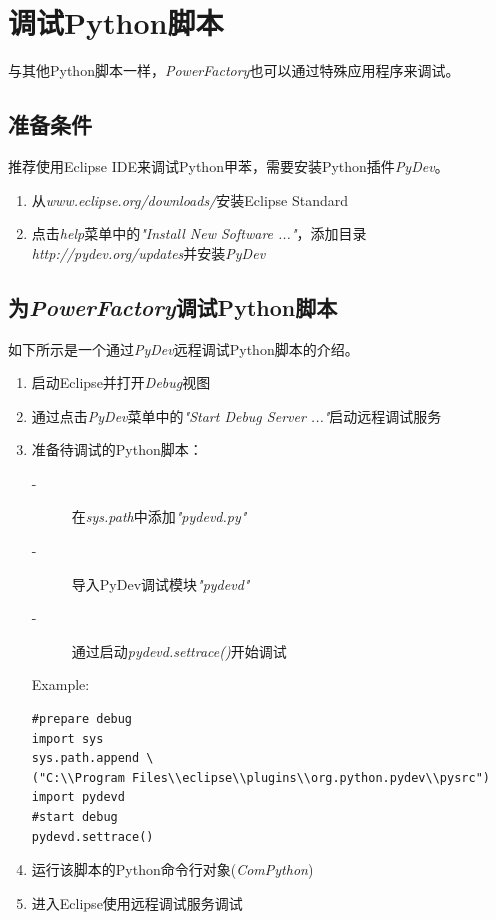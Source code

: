 \section{调试Python脚本}

与其他Python脚本一样，\emph{PowerFactory}也可以通过特殊应用程序来调试。

\subsection{准备条件}

推荐使用Eclipse IDE来调试Python甲苯，需要安装Python插件\emph{PyDev}。

\begin{enumerate}
\item 从\emph{www.eclipse.org/downloads/}安装Eclipse Standard
\item 点击\emph{help}菜单中的\emph{"Install New Software ..."}，添加目录\emph{http://pydev.org/updates}并安装\emph{PyDev}
\end{enumerate}

\subsection{为\emph{PowerFactory}调试Python脚本}

如下所示是一个通过\emph{PyDev}远程调试Python脚本的介绍。

\begin{enumerate}
\item 启动Eclipse并打开\emph{Debug}视图
\item 通过点击\emph{PyDev}菜单中的\emph{"Start Debug Server ..."}启动远程调试服务
\item 准备待调试的Python脚本：

	\begin{description}
	\item[-] 在\emph{sys.path}中添加\emph{"pydevd.py"}
	\item[-] 导入PyDev调试模块\emph{"pydevd"}
	\item[-] 通过启动\emph{pydevd.settrace()}开始调试
	\end{description}
	
Example:

\begin{verbatim}
#prepare debug
import sys
sys.path.append \
("C:\\Program Files\\eclipse\\plugins\\org.python.pydev\\pysrc")
import pydevd
#start debug
pydevd.settrace()
\end{verbatim}

	
\item 运行该脚本的Python命令行对象(\emph{ComPython})
\item 进入Eclipse使用远程调试服务调试

\end{enumerate}


